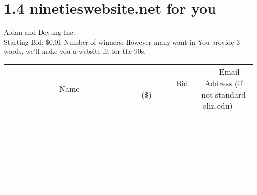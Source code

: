 \documentclass[11pt]{article}
\begin{document}
\section*{1.4 ninetieswebsite.net for you}
Aidan and Doyung Inc.
\\
Starting Bid: \$0.01
\newline
Number of winners: However many want in
\newline
You provide 3 words, we'll make you a website fit for the 90s.
\\[6ex]
\begin{tabular}{c c c}
~~~~~~~~~~~~~Name~~~~~~~~~~~~~ & ~~~~~~~~~Bid (\$)~~~~~~~~~  & ~~~Email Address (if not standard olin.edu)~~~\\
 & & \\
\hline
 & & \\
\hline
 & & \\
\hline
 & & \\
\hline
 & & \\
\hline
 & & \\
\hline
 & & \\
\hline
 & & \\
\hline
 & & \\
\hline
 & & \\
\hline
 & & \\
\hline
 & & \\
\hline
 & & \\
\hline
 & & \\
\hline
 & & \\
\hline
 & & \\
\hline
 & & \\
\hline
 & & \\
\hline
 & & \\
\hline
 & & \\
\hline
 & & \\
\hline
 & & \\
\hline
 & & \\
\hline
 & & \\
\hline
 & & \\
\hline
 & & \\
\hline
\end{tabular}
\newpage
\end{document}
